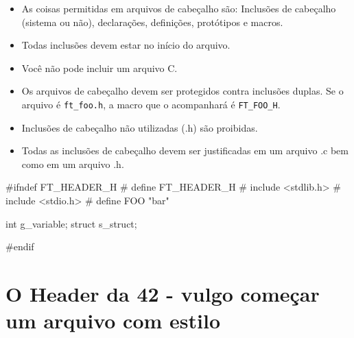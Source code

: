 \documentclass{42-pt}
\begin{document}
        \begin{itemize}

            \item As coisas permitidas em arquivos de cabeçalho são:
                Inclusões de cabeçalho (sistema ou não), declarações, definições,
                protótipos e macros.

            \item Todas inclusões devem estar no início do arquivo.

            \item Você não pode incluir um arquivo C.

            \item Os arquivos de cabeçalho devem ser protegidos contra inclusões
             duplas. Se o arquivo é \texttt{ft\_foo.h}, a macro que o acompanhará
             é \texttt{FT\_FOO\_H}.

            \item Inclusões de cabeçalho não utilizadas (.h) são proibidas.

            \item Todas as inclusões de cabeçalho devem ser justificadas em um arquivo .c
                bem como em um arquivo .h.

        \end{itemize}

        \begin{42ccode}
#ifndef FT_HEADER_H
# define FT_HEADER_H
# include <stdlib.h>
# include <stdio.h>
# define FOO "bar"

int g_variable;
struct s_struct;

#endif
        \end{42ccode}
        \newpage


   \section{O Header da 42 - vulgo começar um arquivo com estilo}
\end{document}
